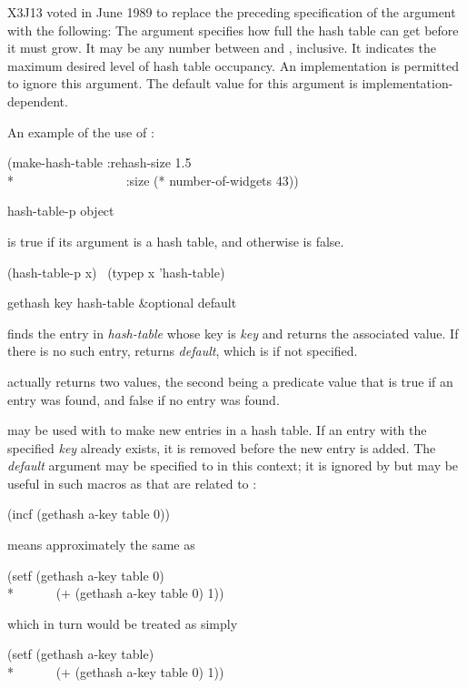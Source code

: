 \begin{defun}[Function]
\begin{newer}
X3J13 voted in June 1989  to replace
the preceding specification of the  argument
with the following:
The  argument
specifies how full the hash table can get before it must grow.
It may be any  number between  and , inclusive.
It indicates the maximum desired level of hash table occupancy.
An implementation is permitted to ignore this argument.
The default value for this argument is implementation-dependent.
\end{newer}

An example of the use of :
\begin{lisp}
(make-hash-table :rehash-size 1.5 \\*
~~~~~~~~~~~~~~~~~:size (* number-of-widgets 43))
\end{lisp}
\end{defun}

\begin{defun}[Function]
hash-table-p object

 is true if its argument is a hash table,
and otherwise is false.
\begin{lisp}
(hash-table-p x) \EQ\ (typep x 'hash-table)
\end{lisp}
\end{defun}

\begin{defun}[Function]
gethash key hash-table &optional default

 finds the entry in \emph{hash-table} whose key is \emph{key}
and returns the
associated value.  If there is no such entry,  returns \emph{default},
which is {\false} if not specified.

 actually returns two values, the second being a predicate
value that is true if an entry was found, and false if no entry was found.

 may be used with  to make new entries in a hash
table.  If an entry with the specified \emph{key} already exists, it is
removed before the new entry is added.  The \emph{default} argument may be
specified to  in this context; it is ignored by 
but may be useful in such macros as  that are related to :
\begin{lisp}
(incf (gethash a-key table 0))
\end{lisp}
means approximately the same as
\begin{lisp}
(setf (gethash a-key table 0) \\*
~~~~~~(+ (gethash a-key table 0) 1))
\end{lisp}
which in turn would be treated as simply
\begin{lisp}
(setf (gethash a-key table) \\*
~~~~~~(+ (gethash a-key table 0) 1))
\end{lisp}
\end{defun}

